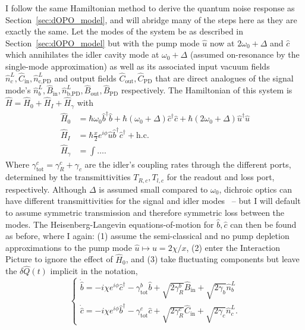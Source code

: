 I follow the same Hamiltonian method to derive the quantum noise response as Section~\ref{sec:dOPO_model}, and will abridge many of the steps here as they are exactly the same. Let the modes of the system be as described in Section~\ref{sec:dOPO_model} but with the pump mode $\hat u$ now at $2\omega_0+\Delta$ and $\hat c$ which annihilates the idler cavity mode at $\omega_0+\Delta$ (assumed on-resonance by the single-mode approximation) as well as its associated input vacuum fields $\hat n^L_c, \hat C_\text{in}, \hat n^L_\text{c,PD}$ and output fields $\hat C_\text{out}, \hat C_\text{PD}$ that are direct analogues of the signal mode's $\hat n^L_b, \hat B_\text{in}, \hat n^L_\text{b,PD}, \hat B_\text{out}, \hat B_\text{PD}$ respectively. The Hamiltonian of this system is $\hat H = \hat H_0+\hat H_I+\hat H_\gamma$ with 
\begin{align}
\hat H_0 &= \hbar \omega_0 \hat b^\dag \hat b + \hbar (\omega_0+\Delta) \hat c^\dag \hat c + \hbar (2\omega_0+\Delta) \hat u^\dag \hat u\\
\hat H_I &= \hbar \frac{x}{2} e^{i\phi} \hat u \hat b^\dag \hat c^\dag + \text{h.c.}\\
\hat H_\gamma &= \int \ldots .
\end{align}
Where $\gamma^c_\text{tot}=\gamma^c_R+\gamma_c$ are the idler's coupling rates through the different ports, determined by the transmittivities $T_{R,c}, T_{l,c}$ for the readout and loss port, respectively. Although $\Delta$ is assumed small compared to $\omega_0$, dichroic optics can have different transmittivities for the signal and idler modes~\cite{} -- but I will default to assume symmetric transmission and therefore symmetric loss between the modes. The Heisenberg-Langevin equations-of-motion for $\hat b, \hat c$ can then be found as before, where I again: (1) assume the semi-classical and no pump depletion approximations to the pump mode $\hat u\mapsto u=2\chi/x$, (2) enter the Interaction Picture to ignore the effect of $\hat H_0$, and (3) take fluctuating components but leave the $\delta \hat Q(t)$ implicit in the notation,
\begin{equation}\begin{cases}
\dot{\hat{b}}=-i\chi e^{i\phi}\hat{c}^\dagger - \gamma^b_\mathrm{tot} \hat{b} + \sqrt{2\gamma^b_R}\hat{B}_\mathrm{in} + \sqrt{2\gamma_b}\hat{n}^L_b\\
\dot{\hat{c}}=-i\chi e^{i\phi}\hat{b}^\dagger - \gamma^c_\mathrm{tot} \hat{c} + \sqrt{2\gamma^c_R}\hat{C}_\mathrm{in} + \sqrt{2\gamma_c}\hat{n}^L_c.
\end{cases}\end{equation}
